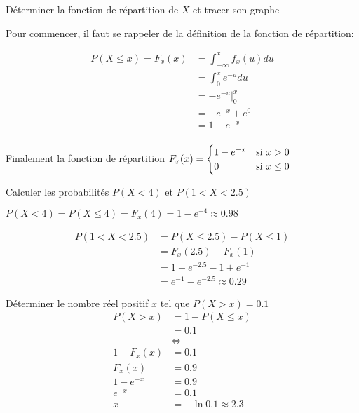 \begin{exo}
	\begin{subexo}{Déterminer la fonction de répartition de $X$ et tracer son graphe}
		\begin{center}
			Pour commencer, il faut se rappeler de la définition de la fonction de répartition:  
		\end{center}
		\begin{align*}
			P(X \leq x) = F_x(x) &= \int_{-\infty}^{x}{f_x(u)}du \\
			&= \int_{0}^{x}{e^{-u}}du \\
			&= -e^{-u}\bigg\vert_{0}^{x} \\
			&= -e^{-x} + e^{0} \\
			&= 1 - e^{-x} \\
		\end{align*}
		\begin{center}
			Finalement la fonction de répartition $F_x(x) = \begin{cases}
				1 - e^{-x} & \text{si $ x > 0$} \\
				0 & \text{si $ x \leq 0$ } \\
			\end{cases}$
		\end{center}
	\end{subexo}
	\begin{subexo}{Calculer les probabilités $P(X < 4)$ et $P(1 < X < 2.5)$}
		\begin{center}
		 $P(X < 4) = P(X \le 4) = F_x(4) = 1-e^{-4} \approx 0.98$
		\end{center}
		\begin{align*}
			P(1 < X < 2.5) &= P(X \le 2.5) - P(X \le 1) \\
			&= F_x(2.5) - F_x(1) \\
			&= 1-e^{-2.5} -1 + e^{-1} \\
			&= e^{-1}- e^{-2.5} \approx 0.29
		\end{align*}
	\end{subexo}
	\begin{subexo}{Déterminer le nombre réel positif $x$ tel que $P(X > x) = 0.1$}
		\begin{align*}
			P(X > x) &= 1 - P(X \le x) \\
			&= 0.1 \\
			&\iff \\
			1-F_x(x) &= 0.1 \\
			F_x(x) &= 0.9 \\
			1-e^{-x} &= 0.9 \\
			e^{-x} &= 0.1 \\
			x & = -\ln{0.1} \approx 2.3 \\
		\end{align*}
	\end{subexo}
\end{exo}